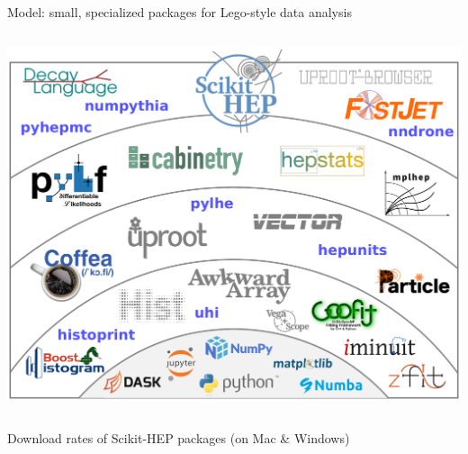 \documentclass[aspectratio=169]{beamer}
\begin{document}
\begin{frame}{Model: small, specialized packages for Lego-style data analysis}
\begin{columns}
\begin{uncoverenv}
\includegraphics[width=\linewidth]{PLOTS/shells-hep.pdf}
\end{uncoverenv}
\end{columns}
\end{frame}

\begin{frame}{Download rates of Scikit-HEP packages (on Mac \& Windows)}
\vspace{0.25 cm}
\end{frame}
\end{document}
